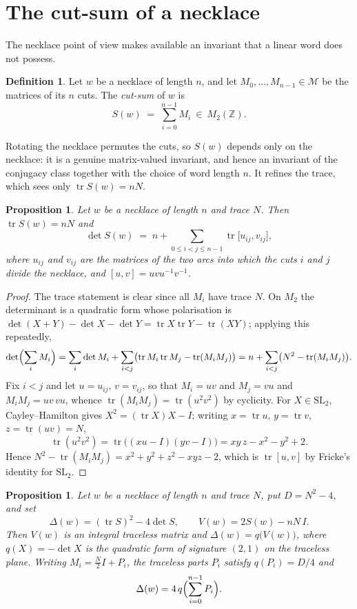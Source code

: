 \documentclass[11pt,reqno]{amsart}
\theoremstyle{plain}
\newtheorem{proposition}[theorem]{Proposition}
\theoremstyle{definition}
\newtheorem{definition}[theorem]{Definition}
\newcommand{\Z}{\mathbb{Z}}
\newcommand{\Mon}{\mathcal{M}}
\newcommand{\tr}{\operatorname{tr}}
\newcommand{\SL}{\mathrm{SL}}
\begin{document}
\section{The cut-sum of a necklace}\label{sec:cutsum}

The necklace point of view makes available an invariant that a linear word does not
possess.

\begin{definition}\label{def:cutsum}
Let $w$ be a necklace of length $n$, and let $M_0,\dots,M_{n-1}\in\Mon$ be the matrices
of its $n$ cuts. The \emph{cut-sum} of $w$ is
\[
  S(w)\;=\;\sum_{i=0}^{n-1}M_i\ \in\ M_2(\Z).
\]
\end{definition}

Rotating the necklace permutes the cuts, so $S(w)$ depends only on the necklace: it is a
genuine matrix-valued invariant, and hence an invariant of the conjugacy class together
with the choice of word length $n$. It refines the trace, which sees only
$\tr S(w)=nN$.

\begin{proposition}\label{prop:detS}
Let $w$ be a necklace of length $n$ and trace $N$. Then $\tr S(w)=nN$ and
\begin{equation}\label{eq:detS}
  \det S(w)\;=\;n+\sum_{0\le i<j\le n-1}\tr\bigl[u_{ij},v_{ij}\bigr],
\end{equation}
where $u_{ij}$ and $v_{ij}$ are the matrices of the two arcs into which the cuts $i$ and
$j$ divide the necklace, and $[u,v]=uvu^{-1}v^{-1}$.
\end{proposition}

\begin{proof}
The trace statement is clear since all $M_i$ have trace $N$. On $M_2$ the determinant is
a quadratic form whose polarisation is
$\det(X+Y)-\det X-\det Y=\tr X\tr Y-\tr(XY)$; applying this repeatedly,
\[
  \det\Bigl(\sum_i M_i\Bigr)=\sum_i\det M_i+\sum_{i<j}\bigl(\tr M_i\tr M_j-\tr(M_iM_j)\bigr)
  = n+\sum_{i<j}\bigl(N^2-\tr(M_iM_j)\bigr).
\]
Fix $i<j$ and let $u=u_{ij}$, $v=v_{ij}$, so that $M_i=uv$ and $M_j=vu$ and
$M_iM_j=uv\,vu$, whence $\tr(M_iM_j)=\tr(u^2v^2)$ by cyclicity. For $X\in\SL_2$,
Cayley--Hamilton gives $X^2=(\tr X)X-I$; writing $x=\tr u$, $y=\tr v$, $z=\tr(uv)=N$,
\[
  \tr(u^2v^2)=\tr\bigl((xu-I)(yv-I)\bigr)=xy\,z-x^2-y^2+2 .
\]
Hence $N^2-\tr(M_iM_j)=x^2+y^2+z^2-xyz-2$, which is $\tr[u,v]$ by Fricke's identity for
$\SL_2$.
\end{proof}

\begin{proposition}\label{prop:minkowski}
Let $w$ be a necklace of length $n$ and trace $N$, put $D=N^2-4$, and set
\[
  \Delta(w)=(\tr S)^2-4\det S,\qquad V(w)=2S(w)-nN\,I .
\]
Then $V(w)$ is an integral traceless matrix and $\Delta(w)=q\bigl(V(w)\bigr)$, where
$q(X)=-\det X$ is the quadratic form of signature $(2,1)$ on the traceless plane. Writing
$M_i=\frac{N}{2}I+P_i$, the traceless parts $P_i$ satisfy $q(P_i)=D/4$ and
\[
  \Delta(w)=4\,q\Bigl(\sum_{i=0}^{n-1}P_i\Bigr).
\]
\end{proposition}
\end{document}
